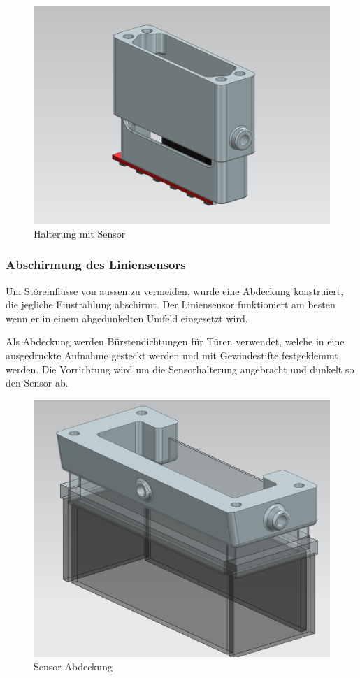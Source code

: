 \begin{figure}[H]
    \centering
    \includegraphics[width=0.75\linewidth]{assets//MT/Sensor Halterung.png}
    \caption{Halterung mit Sensor}
    \label{fig:Halterung mit Sensor}
\end{figure}


\subsubsection{Abschirmung des Liniensensors}
\label{Abschirmung des Liniensensors}
Um Störeinflüsse von aussen zu vermeiden, wurde eine Abdeckung konstruiert, die jegliche Einstrahlung abschirmt. Der Liniensensor funktioniert am besten wenn er in einem abgedunkelten Umfeld eingesetzt wird.

Als Abdeckung werden Bürstendichtungen für Türen verwendet, welche in eine ausgedruckte Aufnahme gesteckt werden und mit Gewindestifte festgeklemmt werden. Die Vorrichtung wird um die Sensorhalterung angebracht und dunkelt so den Sensor ab.

\begin{figure}
    \centering
    \includegraphics[width=0.75\linewidth]{assets//MT/Sensor Abdeckung.png}
    \caption{Sensor Abdeckung}
    \label{fig:Sensor Abdeckung}
\end{figure}
\newpage

